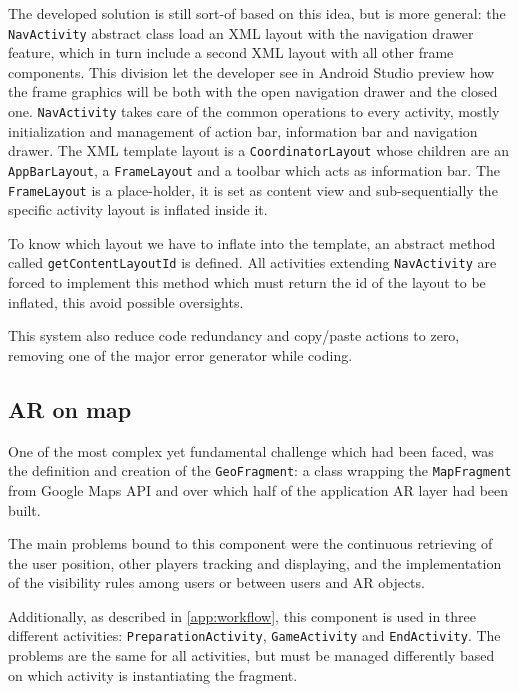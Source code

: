			The developed solution is still sort-of based on this idea, but is more general: the \lstinline|NavActivity| abstract class load an XML layout with the navigation drawer feature, which in turn include a second XML layout with all other frame components.
			This division let the developer see in Android Studio preview how the frame graphics will be both with the open navigation drawer and the closed one.
			\lstinline|NavActivity| takes care of the common operations to every activity, mostly initialization and management of action bar, information bar and navigation drawer.
			The XML template layout is a \lstinline|CoordinatorLayout| whose children are an \lstinline|AppBarLayout|, a \lstinline|FrameLayout| and a toolbar which acts as information bar.
			The \lstinline|FrameLayout| is a place-holder, it is set as content view and sub-sequentially the specific activity layout is inflated inside it.
			
			To know which layout we have to inflate into the template, an abstract method called \lstinline|getContentLayoutId| is defined.
			All activities extending \lstinline|NavActivity| are forced to implement this method which must return the id of the layout to be inflated, this avoid possible oversights.
			
			This system also reduce code redundancy and copy/paste actions to zero, removing one of the major error generator while coding.
		
		\subsection{AR on map}\label{focus:map}
		
			One of the most complex yet fundamental challenge which had been faced, was the definition and creation of the \lstinline|GeoFragment|: a class wrapping the \lstinline|MapFragment| from Google Maps API and over which half of the application AR layer had been built.
			
			The main problems bound to this component were the continuous retrieving of the user position, other players tracking and displaying, and the implementation of the visibility rules among users or between users and AR objects.
			
			Additionally, as described in \autoref{app:workflow}, this component is used in three different activities: \lstinline|PreparationActivity|, \lstinline|GameActivity| and \lstinline|EndActivity|.
			The problems are the same for all activities, but must be managed differently based on which activity is instantiating the fragment.
			
